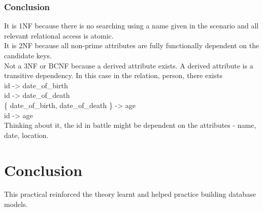 \documentclass[11pt]{article}
\begin{document}
\subsubsection{Conclusion}
\label{sec:org6a1278b}
It is 1NF because there is no searching using a name given in the scenario and all relevant relational access is atomic.\\

It is 2NF because all non-prime attributes are fully functionally dependent on the candidate keys.\\

Not a 3NF or BCNF because a derived attribute exists. A derived attribute is a transitive dependency. In this case in the relation, person, there exists\\
id -> date\_of\_birth\\
id -> date\_of\_death\\
\{ date\_of\_birth, date\_of\_death \} -> age\\
id -> age\\

Thinking about it, the id in battle might be dependent on the attributes - name, date, location.

\section{Conclusion}
\label{sec:org24b39af}
This practical reinforced the theory learnt and helped practice building database models.
\end{document}
